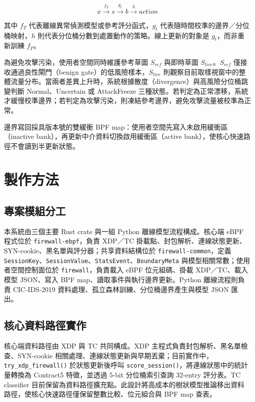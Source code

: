 \documentclass[12pt, a4paper, fontset=none]{ctexart}
\newcommand{\code}[1]{\texttt{#1}}
\begin{document}
\[
x \xrightarrow{f_T} s \xrightarrow{g_t} b \xrightarrow{h} action
\]

其中 $f_T$ 代表離線異常偵測模型或參考評分函式，$g_t$ 代表隨時間校準的邊界／分位桶映射，$h$ 則代表分位桶分數到處置動作的策略。線上更新的對象是 $g_t$，而非重新訓練 $f_T$。

為避免攻擊污染，使用者空間同時維護參考草圖 $S_{ref}$ 與即時草圖 $S_{live}$。$S_{ref}$ 僅接收通過良性閘門（benign gate）的低風險樣本，$S_{live}$ 則觀察目前取樣視窗中的整體流量分布。當兩者差異上升時，系統根據散度（divergence）與高風險分位桶跳變判斷 Normal、Uncertain 或 AttackFreeze 三種狀態。若判定為正常漂移，系統才緩慢校準邊界；若判定為攻擊污染，則凍結參考邊界，避免攻擊流量被校準為正常。

邊界寫回採具版本號的雙緩衝 BPF map：使用者空間先寫入未啟用緩衝區（inactive bank），再更新中介資料切換啟用緩衝區（active bank），使核心快速路徑不會讀到半更新狀態。

\section{製作方法}
\label{sec:implementation}

\subsection{專案模組分工}
本系統由三個主要 Rust crate 與一組 Python 離線模型流程構成。核心端 eBPF 程式位於 \code{firewall-ebpf}，負責 XDP／TC 掛載點、封包解析、連線狀態更新、SYN-cookie、黑名單與評分器；共享資料結構位於 \code{firewall-common}，定義 \code{SessionKey}、\code{SessionValue}、\code{StatsEvent}、\code{BoundaryMeta} 與模型相關常數；使用者空間控制面位於 \code{firewall}，負責載入 eBPF 位元組碼、掛載 XDP／TC、載入模型 JSON、寫入 BPF map、讀取事件與執行邊界更新。Python 離線流程則負責 CIC-IDS-2019 資料處理、孤立森林訓練、分位桶邊界產生與模型 JSON 匯出。

\subsection{核心資料路徑實作}
核心端資料路徑由 XDP 與 TC 共同構成。XDP 主程式負責封包解析、黑名單檢查、SYN-cookie 相關處理、連線狀態更新與早期丟棄；目前實作中，\code{try\_xdp\_firewall()} 於狀態更新後呼叫 \code{score\_session()}，將連線狀態中的統計量轉換為 Contract5 特徵，並透過 5-bit 分位桶索引查詢 32-entry 評分表。TC classifier 目前保留為資料路徑擴充點。此設計將高成本的樹狀模型推論移出資料路徑，使核心快速路徑僅保留整數比較、位元組合與 BPF map 查表。
\end{document}
